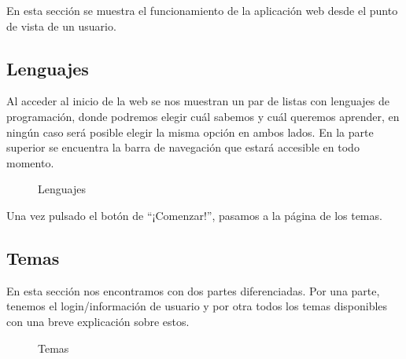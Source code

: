 
En esta sección se muestra el funcionamiento de la aplicación web desde el punto de vista de un usuario.

\subsection{Lenguajes}
Al acceder al inicio de la web se nos muestran un par de listas con lenguajes de programación, donde podremos elegir cuál sabemos y cuál queremos aprender, en ningún caso será posible elegir la misma opción en ambos lados. En la parte superior se encuentra la barra de navegación que estará accesible en todo momento.

\begin{figure}[H]
\begin{center}
\caption{Lenguajes\label{fig:lenguajes}}
\end{center}
\end{figure}

Una vez pulsado el botón de ``¡Comenzar!'', pasamos a la página de los temas.

\subsection{Temas}
En esta sección nos encontramos con dos partes diferenciadas. Por una parte, tenemos el login/información de usuario y por otra todos los temas disponibles con una breve explicación sobre estos.

\begin{figure}[H]
\begin{center}
\caption{Temas\label{fig:temas}}
\end{center}
\end{figure}

